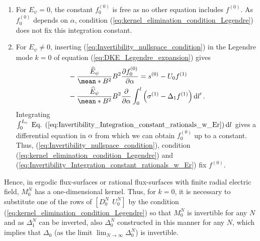 \documentclass[10pt]{iopart}
\begin{document}
\begin{enumerate}
	\item For $E_\psi =0$, the constant $f^{(0)}_0$ is free as no other equation includes $f^{(0)}$. As $f_0^{(0)}$ depends on $\alpha$, condition (\ref{eq:kernel_elimination_condition_Legendre}) does not fix this integration constant. %
	\item For $E_\psi \ne 0$,	
	inserting (\ref{eq:Invertibility_nullspace_condition}) in the Legendre mode $k=0$ of equation (\ref{eq:DKE_Legendre_expansion}) gives
	\begin{align}  
		& -\frac{\widehat{E}_\psi}{\mean*{B^2}}
		B^2 \pdv{f_0^{(0)}}{\alpha} 
		=
		s^{(0)}
		- U_0 f^{(1)}
		\label{eq:Invertibility_Integration_constant_rationals_w_Er}
		\\
		& %
		-
		\frac{\widehat{E}_\psi}{\mean*{B^2}}
		B^2 \pdv{}{\alpha} 
		\int_{0}^{l}
		\left(
		\sigma^{(1)}
		- \Delta_1 f^{(1)} 
		\right)\dd{l'}.\nonumber
	\end{align}
	Integrating $\int_{0}^{L_{\text{c}}} \text{ Eq. (\ref{eq:Invertibility_Integration_constant_rationals_w_Er})}\dd{l}$ gives a differential equation in $\alpha$ from which we can obtain $f_0^{(0)}$ up to a constant. Thus, (\ref{eq:Invertibility_nullspace_condition}), condition (\ref{eq:kernel_elimination_condition_Legendre}) and (\ref{eq:Invertibility_Integration_constant_rationals_w_Er}) fix $f^{(0)}$. 
\end{enumerate} 

Hence, in ergodic flux-surfaces or rational flux-surfaces with finite radial electric field, $M_0^N$ has a one-dimensional kernel. Thus, for $k=0$, it is necessary to substitute one of the rows of $[D_0^N \ \ U_0^N]$ by the condition (\ref{eq:kernel_elimination_condition_Legendre}) so that $M_0^N$ is invertible for any $N$ and as $\Delta_1^N$ can be inverted, also $\Delta_0^N$ constructed in this manner for any $N$, which implies that $\Delta_0$ (as the limit $\lim_{N\rightarrow\infty} \Delta_0^N$) is invertible.
 
\end{document}
